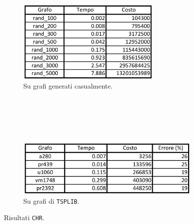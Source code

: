 \begin{figure}[H]
    \centering
    \begin{subfigure}{\linewidth}
        \centering
        \includegraphics[width=200pt]{img/CHRrandom.png}
        \caption*{Su grafi generati casualmente.}
    \end{subfigure}
    \ \\
    \ \\
    \ \\
    \ \\
    \begin{subfigure}{\linewidth}
        \centering
        \includegraphics[width=300pt]{img/CHRtsplib.png}
        \caption*{Su grafi di \texttt{TSPLIB}.}
    \end{subfigure}
    \caption{Risultati \texttt{CHR}.}
\end{figure}
\ \\
\ \\

